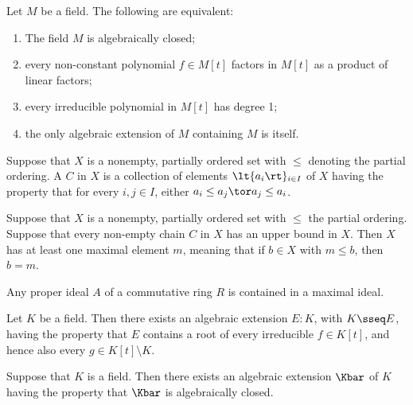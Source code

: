 \documentclass{article}
\begin{document}
  \begin{lemma}
    Let $ M $ be a field.
    The following are equivalent: \begin{enumerate}[label=(\roman*)]
      \item The field $ M $ is algebraically closed;
      \item every non-constant polynomial $ f\in M[t] $ factors in $ M[t] $ as a product of linear factors;
      \item every irreducible polynomial in $ M[t] $ has degree 1;
      \item the only algebraic extension of $ M $ containing $ M $ is itself.
    \end{enumerate}
  \end{lemma}

  \begin{definition}[Chain]
    Suppose that $ X $ is a nonempty, partially ordered set with $ \leq $ denoting the partial ordering.
    A  $ C $ in $ X $ is a collection of elements $ \lt\{ a_i \rt\}_{i\in I} $ of $ X $ having the property that for every $ i,j\in I $, either $ a_i\leq a_j \tor a_j\leq a_i $.
  \end{definition}

  \quad Suppose that $ X $ is a nonempty, partially ordered set with $ \leq $ the partial ordering.
  Suppose that every non-empty chain $ C $ in $ X $ has an upper bound in $ X $.
  Then $ X $ has at least one maximal element $ m $, meaning that if $ b\in X $ with $ m\leq b $, then $ b=m $.

  \begin{proposition}
    Any proper ideal $ A $ of a commutative ring $ R $ is contained in a maximal ideal.
  \end{proposition}

  \begin{lemma}
    Let $ K $ be a field. Then there exists an algebraic extension $ E:K $, with $ K\sseq E $, having the property that $ E $ contains a root of every irreducible $ f\in K[t] $, and hence also every $ g\in K[t]\setminus K $.
  \end{lemma}

  \begin{theorem}
    Suppose that $ K $ is a field.
    Then there exists an algebraic extension $ \Kbar $ of $ K $ having the property that $ \Kbar $ is algebraically closed.
  \end{theorem}
\end{document}
